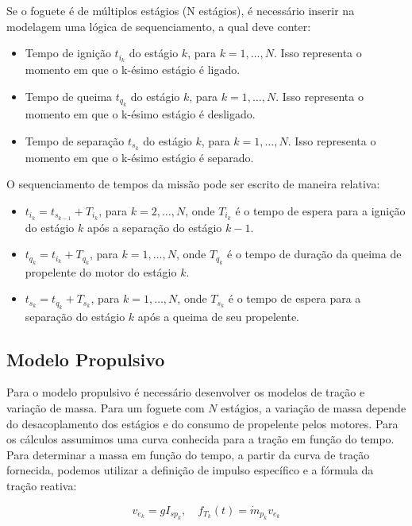 Se o foguete é de múltiplos estágios (N estágios), é necessário inserir na modelagem uma lógica de sequenciamento, a qual deve conter:

\begin{itemize}
    \item Tempo de ignição $t_{i_{k}}$ do estágio $k$, para $k = 1, \ldots, N$. Isso representa o momento em que o k-ésimo estágio é ligado.
   \item Tempo de queima $t_{q_{k}}$ do estágio $k$, para $k = 1, \ldots, N$. Isso representa o momento em que o k-ésimo estágio é desligado.
   \item Tempo de separação $t_{s_{k}}$ do estágio $k$, para $k = 1, \ldots, N$. Isso representa o momento em que o k-ésimo estágio é separado.
\end{itemize}

O sequenciamento de tempos da missão pode ser escrito de maneira relativa:

\begin{itemize}
    \item $t_{i_{k}} = t_{s_{k-1}} + T_{i_{k}}$, para $k = 2, \ldots, N$, onde $T_{i_{k}}$ é o tempo de espera para a ignição do estágio $k$ após a separação do estágio $k-1$.
    \item $t_{q_{k}} = t_{i_{k}} + T_{q_{k}}$, para $k = 1, \ldots, N$, onde $T_{q_{k}}$ é o tempo de duração da queima de propelente do motor do estágio $k$.
    \item $t_{s_{k}} = t_{q_{k}} + T_{s_{k}}$, para $k = 1, \ldots, N$, onde $T_{s_{k}}$ é o tempo de espera para a separação do estágio $k$ após a queima de seu propelente.

\end{itemize}


\subsection{Modelo Propulsivo}

Para o modelo propulsivo é necessário desenvolver os modelos de tração e variação de massa. Para um foguete com $N$ estágios, a variação de massa depende do desacoplamento dos estágios e do consumo de propelente pelos motores. Para os cálculos assumimos uma curva conhecida para a tração em função do tempo. Para determinar a massa em função do tempo, a partir da curva de tração fornecida, podemos utilizar a definição de impulso específico e a fórmula da tração reativa:

\begin{equation}
v_{e_{k}} = g I_{sp_{k}}, \quad f_{T_{k}}(t) = \dot{m}_{p_{k}} v_{e_{k}}
\end{equation}

